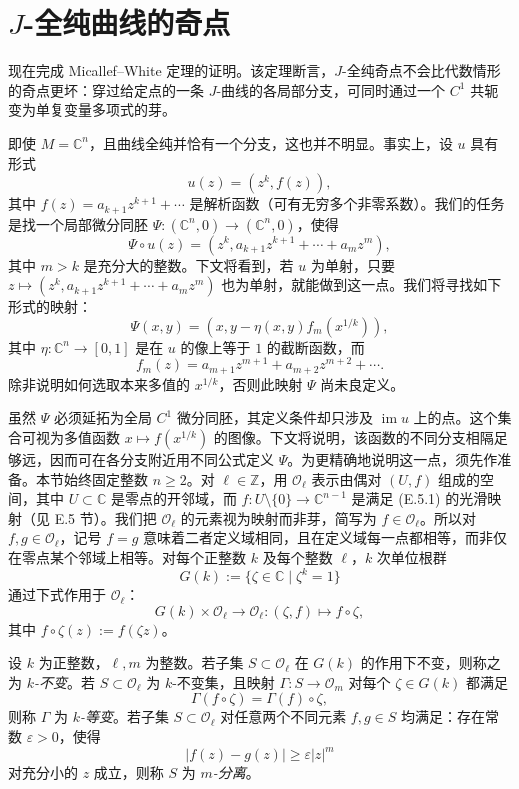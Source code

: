 
\section{$J$-全纯曲线的奇点}\label{sec:E-7}

现在完成 Micallef--White 定理的证明。该定理断言，$J$-全纯奇点不会比代数情形的奇点更坏：穿过给定点的一条 $J$-曲线的各局部分支，可同时通过一个 $C^1$ 共轭变为单复变量多项式的芽。

即使 $M=\mathbb C^n$，且曲线全纯并恰有一个分支，这也并不明显。事实上，设 $u$ 具有形式
\[
  u(z)=(z^k,f(z)),
\]
其中 $f(z)=a_{k+1}z^{k+1}+\cdots$ 是解析函数（可有无穷多个非零系数）。我们的任务是找一个局部微分同胚 $\Psi:(\mathbb C^n,0)\to(\mathbb C^n,0)$，使得
\[
  \Psi\circ u(z)=(z^k,a_{k+1}z^{k+1}+\cdots+a_mz^m),
\]
其中 $m>k$ 是充分大的整数。下文将看到，若 $u$ 为单射，只要 $z\mapsto(z^k,a_{k+1}z^{k+1}+\cdots+a_mz^m)$ 也为单射，就能做到这一点。我们将寻找如下形式的映射：
\[
  \Psi(x,y)=(x,y-\eta(x,y)f_m(x^{1/k})),
\]
其中 $\eta:\mathbb C^n\to[0,1]$ 是在 $u$ 的像上等于 $1$ 的截断函数，而
\begin{equation}\label{eq:E-7-1}
  f_m(z)=a_{m+1}z^{m+1}+a_{m+2}z^{m+2}+\cdots.
\end{equation}
除非说明如何选取本来多值的 $x^{1/k}$，否则此映射 $\Psi$ 尚未良定义。

虽然 $\Psi$ 必须延拓为全局 $C^1$ 微分同胚，其定义条件却只涉及 $\operatorname{im}u$ 上的点。这个集合可视为多值函数 $x\mapsto f(x^{1/k})$ 的图像。下文将说明，该函数的不同分支相隔足够远，因而可在各分支附近用不同公式定义 $\Psi$。为更精确地说明这一点，须先作准备。本节始终固定整数 $n\ge2$。对 $\ell\in\mathbb Z$，用 $\mathcal O_\ell$ 表示由偶对 $(U,f)$ 组成的空间，其中 $U\subset\mathbb C$ 是零点的开邻域，而 $f:U\setminus\{0\}\to\mathbb C^{n-1}$ 是满足 (E.5.1) 的光滑映射（见 E.5 节）。我们把 $\mathcal O_\ell$ 的元素视为映射而非芽，简写为 $f\in\mathcal O_\ell$。所以对 $f,g\in\mathcal O_\ell$，记号 $f=g$ 意味着二者定义域相同，且在定义域每一点都相等，而非仅在零点某个邻域上相等。对每个正整数 $k$ 及每个整数 $\ell$，$k$ 次单位根群
\[
  G(k):=\{\zeta\in\mathbb C\mid\zeta^k=1\}
\]
通过下式作用于 $\mathcal O_\ell$：
\[
  G(k)\times\mathcal O_\ell\to\mathcal O_\ell:
  (\zeta,f)\longmapsto f\circ\zeta,
\]
其中 $f\circ\zeta(z):=f(\zeta z)$。

\begin{definition}\label{def:E-7-1}
设 $k$ 为正整数，$\ell,m$ 为整数。若子集 $S\subset\mathcal O_\ell$ 在 $G(k)$ 的作用下不变，则称之为 \emph{$k$-不变}。若 $S\subset\mathcal O_\ell$ 为 $k$-不变集，且映射 $\Gamma:S\to\mathcal O_m$ 对每个 $\zeta\in G(k)$ 都满足
\[
  \Gamma(f\circ\zeta)=\Gamma(f)\circ\zeta,
\]
则称 $\Gamma$ 为 \emph{$k$-等变}。若子集 $S\subset\mathcal O_\ell$ 对任意两个不同元素 $f,g\in S$ 均满足：存在常数 $\varepsilon>0$，使得
\[
  |f(z)-g(z)|\ge\varepsilon|z|^m
\]
对充分小的 $z$ 成立，则称 $S$ 为 \emph{$m$-分离}。
\end{definition}

